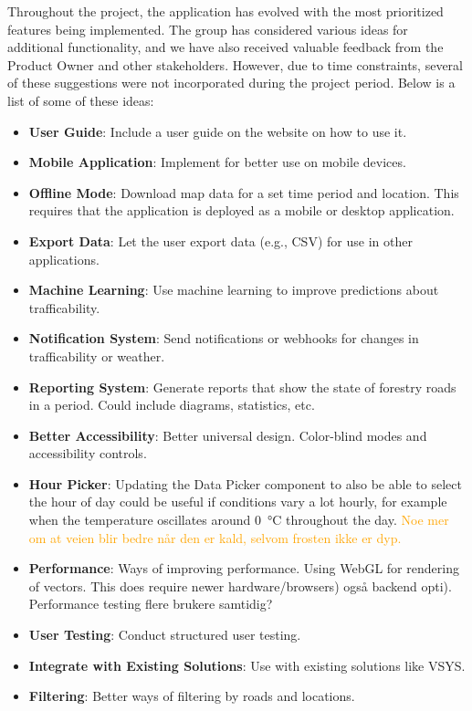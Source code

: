 Throughout the project, the application has evolved with the most prioritized features being implemented. The group has considered various ideas for additional functionality, and we have also received valuable feedback from the Product Owner and other stakeholders. However, due to time constraints, several of these suggestions were not incorporated during the project period. Below is a list of some of these ideas:

\begin{itemize}
    \item \textbf{User Guide}: Include a user guide on the website on how to use it.
    \item \textbf{Mobile Application}: Implement for better use on mobile devices.
    \item \textbf{Offline Mode}: Download map data for a set time period and location. This requires that the application is deployed as a mobile or desktop application.
    \item \textbf{Export Data}: Let the user export data (e.g., CSV) for use in other applications.
    \item \textbf{Machine Learning}: Use machine learning to improve predictions about trafficability.
    \item \textbf{Notification System}: Send notifications or webhooks for changes in trafficability or weather.
    \item \textbf{Reporting System}: Generate reports that show the state of forestry roads in a period. Could include diagrams, statistics, etc.
    \item \textbf{Better Accessibility}: Better universal design. Color-blind modes and accessibility controls.
    \item \textbf{Hour Picker}: Updating the Data Picker component to also be able to select the hour of day could be useful if conditions vary a lot hourly, for example when the temperature oscillates around \qty{0}{\celsius} throughout the day. \textcolor{orange}{Noe mer om at veien blir bedre når den er kald, selvom frosten ikke er dyp.}
    \item \textbf{Performance}: Ways of improving performance. Using WebGL for rendering of vectors. This does require newer hardware/browsers) også backend opti). Performance testing flere brukere samtidig?
    \item \textbf{User Testing}: Conduct structured user testing.
    \item \textbf{Integrate with Existing Solutions}: Use with existing solutions like VSYS. 
    \item \textbf{Filtering}: Better ways of filtering by roads and locations.
\end{itemize}

